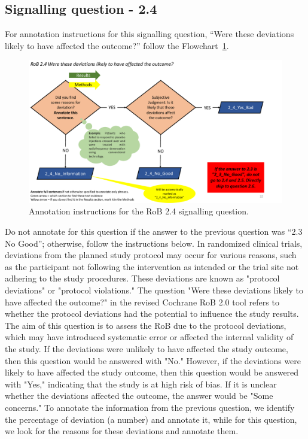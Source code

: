 \documentclass[sn-mathphys,Numbered]{sn-jnl}%
\begin{document}
\subsection*{Signalling question - 2.4 }
%
For annotation instructions for this signalling question, ``Were these deviations likely to have affected the outcome?'' follow the Flowchart~\ref{fig:2_4}.
%
\begin{figure}[hbt]
    \centering
    \includegraphics[width=\textwidth]{figures/2_4.pdf}
    \caption{Annotation instructions for the RoB 2.4 signalling question.}
    \label{fig:2_4}
\end{figure}
%
Do not annotate for this question if the answer to the previous question was ``2.3 No Good''; otherwise, follow the instructions below.
In randomized clinical trials, deviations from the planned study protocol may occur for various reasons, such as the participant not following the intervention as intended or the trial site not adhering to the study procedures.
These deviations are known as "protocol deviations" or "protocol violations."
The question "Were these deviations likely to have affected the outcome?" in the revised Cochrane RoB 2.0 tool refers to whether the protocol deviations had the potential to influence the study results.
The aim of this question is to assess the RoB due to the protocol deviations, which may have introduced systematic error or affected the internal validity of the study.
If the deviations were unlikely to have affected the study outcome, then this question would be answered with "No."
However, if the deviations were likely to have affected the study outcome, then this question would be answered with "Yes," indicating that the study is at high risk of bias.
If it is unclear whether the deviations affected the outcome, the answer would be "Some concerns."
To annotate the information from the previous question, we identify the percentage of deviation (a number) and annotate it, while for this question, we look for the reasons for these deviations and annotate them.
\end{document}
